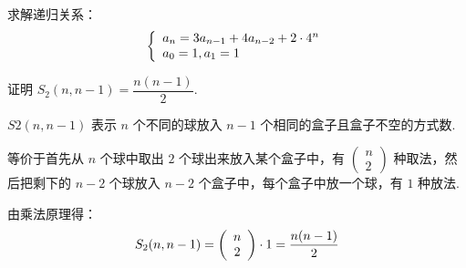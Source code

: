 \documentclass[cn, hazy, blue, normal, 12pt]{elegantnote}
\begin{document}
\begin{exercise}

    求解递归关系：
    \begin{equation}
        \notag
        \left\{\begin{array}{l}
            a_{n}=3 a_{n-1}+4 a_{n-2}+2 \cdot 4^{n} \\
            a_{0}=1, a_{1}=1
        \end{array}\right.
    \end{equation}

\end{exercise}

\begin{exercise}

    证明 $S_{2}(n, n-1) = \dfrac{n(n-1)}{2}$.

\end{exercise}

\begin{solution}[print=true]

    $S2(n,n-1)$ 表示 $n$ 个不同的球放入 $n-1$ 个相同的盒子且盒子不空的方式数.

    等价于首先从 $n$ 个球中取出 $2$ 个球出来放入某个盒子中，有
    $\left(\begin{array}{c}n\\2\end{array}\right)$
    种取法，然后把剩下的 $n-2$ 个球放入 $n-2$ 个盒子中，每个盒子中放一个球，有 $1$ 种放法.

    由乘法原理得：
    \begin{equation}
        \notag
        S_{2}(n, n-1) = \left(\begin{array}{c}n\\2\end{array}\right) \cdot 1 = \dfrac{n(n-1)}{2}
    \end{equation}

\end{solution}
\end{document}
